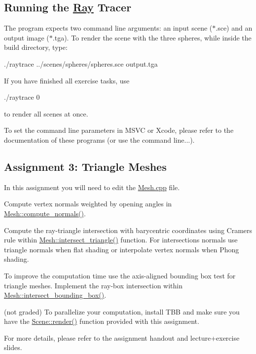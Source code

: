 \subsection*{Running the \hyperlink{classRay}{Ray} Tracer }

The program expects two command line arguments\+: an input scene ({\ttfamily $\ast$.sce}) and an output image ({\ttfamily $\ast$.tga}). To render the scene with the three spheres, while inside the {\ttfamily build} directory, type\+: \begin{DoxyVerb}./raytrace ../scenes/spheres/spheres.sce output.tga
\end{DoxyVerb}


If you have finished all exercise tasks, use \begin{DoxyVerb}./raytrace 0
\end{DoxyVerb}


to render all scenes at once.

To set the command line parameters in M\+S\+VC or Xcode, please refer to the documentation of these programs (or use the command line...).

\subsection*{Assignment 3\+: Triangle Meshes }

In this assignment you will need to edit the \hyperlink{Mesh_8cpp}{Mesh.\+cpp} file.


\begin{DoxyItemize}
\item Compute vertex normals weighted by opening angles in \hyperlink{classMesh_a4e9bedfc415b7135c9587f63535fcb6d}{Mesh\+::compute\+\_\+normals()}.
\item Compute the ray-\/triangle intersection with barycentric coordinates using Cramer\textquotesingle{}s rule within \hyperlink{classMesh_a9be7264791ff3de7dbf99f8548fb7725}{Mesh\+::intersect\+\_\+triangle()} function. For intersections normals use triangle normals when flat shading or interpolate vertex normals when Phong shading.
\item To improve the computation time use the axis-\/aligned bounding box test for triangle meshes. Implement the ray-\/box intersection within \hyperlink{classMesh_a5839749bb09a6bf09c56056016cc11b2}{Mesh\+::intersect\+\_\+bounding\+\_\+box()}.
\item (not graded) To parallelize your computation, install T\+BB and make sure you have the \hyperlink{classScene_aeaecd6069dfc02986fd04c9a8f905e89}{Scene\+::render()} function provided with this assignment.
\end{DoxyItemize}

For more details, please refer to the assignment handout and lecture+exercise slides. 